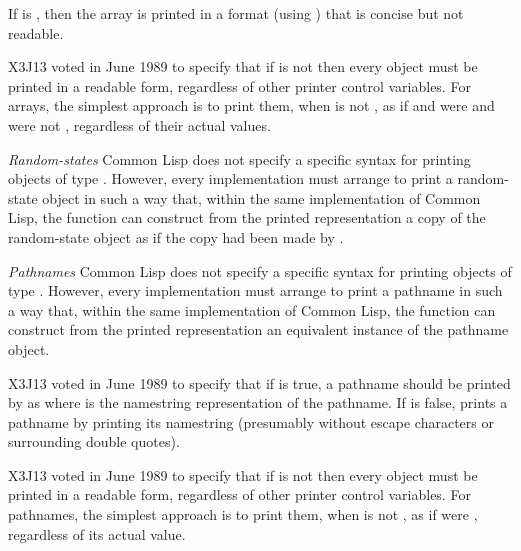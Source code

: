 \begin{flushdesc}
\begin{obsolete}
If  is {\false}, then the array is printed
in a format (using \cd{\#<}) that is concise but not readable.
\end{obsolete}
\begin{newer}
X3J13 voted in June 1989  to specify that if 
is not {\false} then every object must be printed in a readable form,
regardless of other printer control variables.  For arrays, the simplest approach
is to print them, when  is not {\false}, as if 
and  were {\false} and  were not {\false},
regardless of their actual values.
\end{newer}

\item[\emph{Random-states}]
Common Lisp does not specify a specific syntax
for printing objects of type .  However, every implementation
must arrange to print a random-state object in such a way that,
within the same implementation of Common Lisp, the function 
can construct from the printed representation a copy of the random-state
object as if the copy had been made by .

\begin{obsolete}
\item[\emph{Pathnames}]
Common Lisp does not specify a specific syntax
for printing objects of type .  However, every implementation
must arrange to print a pathname in such a way that,
within the same implementation of Common Lisp, the function 
can construct from the printed representation an equivalent
instance of the pathname object.
\end{obsolete}

\begin{newer}
X3J13 voted in June 1989 
to specify that if  is true, a pathname
should be printed by  as  where  is the
namestring representation of the pathname.  If 
is false,  prints a pathname by printing its namestring
(presumably without escape characters or surrounding double quotes).
\end{newer}
\begin{newer}
X3J13 voted in June 1989  to specify that if 
is not {\false} then every object must be printed in a readable form,
regardless of other printer control variables.  For pathnames, the simplest approach
is to print them, when  is not {\false}, as if 
were {\false},
regardless of its actual value.
\end{newer}
\end{flushdesc}

